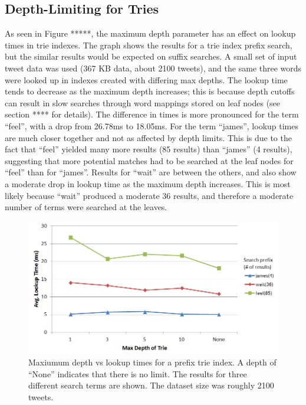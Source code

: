 \documentclass{vldb}
\begin{document}
\subsection{Depth-Limiting for Tries}
As seen in Figure *****, the maximum depth parameter has an effect on lookup times in trie indexes. The graph shows the results for a trie index prefix search, but the similar results would be expected on suffix searches. A small set of input tweet data was used (367 KB data, about 2100 tweets), and the same three words were looked up in indexes created with differing max depths. The lookup time tends to decrease as the maximum depth increases; this is because depth cutoffs can result in slow searches through word mappings stored on leaf nodes (see section **** for details). The difference in times is more pronounced for the term ``feel'', with a drop from 26.78ms to 18.05ms. For the term ``james'', lookup times are much closer together and not as affected by depth limits. This is due to the fact that ``feel'' yielded many more results (85 results) than ``james'' (4 results), suggesting that more potential matches had to be searched at the leaf nodes for ``feel'' than for ``james''. Results for ``wait'' are between the others, and also show a moderate drop in lookup time as the maximum depth increases. This is most likely because ``wait'' produced a moderate 36 results, and therefore a moderate number of terms were searched at the leaves.

\begin{figure}[h!]
   \includegraphics[scale=.43]{trie_maxdepth_graph}
  \caption{Maxiumum depth vs lookup times for a prefix trie index. A depth of ``None'' indicates that there is no limit. The results for three different search terms are shown. The dataset size was roughly 2100 tweets.}
\end{figure}
\end{document}
